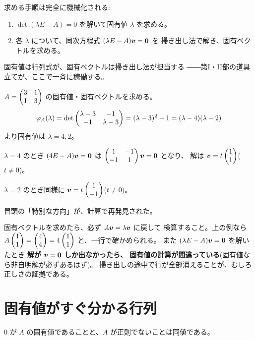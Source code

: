 求める手順は完全に機械化される:
\begin{enumerate}
\item $\det(\lambda E - A) = 0$ を解いて固有値 $\lambda$ を求める。
\item 各 $\lambda$ について、同次方程式 $(\lambda E - A)\bm{v} = \bm{0}$ を
掃き出し法で解き、固有ベクトルを求める。
\end{enumerate}
固有値は行列式が、固有ベクトルは掃き出し法が担当する
――第I・II部の道具立てが、ここで一斉に稼働する。

\begin{rei}
$A = \begin{pmatrix}3 & 1 \\ 1 & 3\end{pmatrix}$ の固有値・固有ベクトルを求める。
\[
\varphi_A(\lambda) = \det \begin{pmatrix}\lambda - 3 & -1 \\ -1 & \lambda - 3\end{pmatrix}
= (\lambda - 3)^2 - 1 = (\lambda - 4)(\lambda - 2)
\]
より固有値は $\lambda = 4, 2$。

$\lambda = 4$ のとき $(4E - A)\bm{v} = \bm{0}$ は
$\begin{pmatrix}1 & -1 \\ -1 & 1\end{pmatrix}\bm{v} = \bm{0}$ となり、
解は $\bm{v} = t\begin{pmatrix}1 \\ 1\end{pmatrix}$($t \neq 0$)。

$\lambda = 2$ のとき同様に $\bm{v} = t\begin{pmatrix}1 \\ -1\end{pmatrix}$($t \neq 0$)。

冒頭の「特別な方向」が、計算で再発見された。
\end{rei}

\begin{chui}[検算のすすめ]
固有ベクトルを求めたら、必ず $A\bm{v} = \lambda\bm{v}$ に戻して
検算すること。上の例なら
$A\begin{pmatrix}1 \\ 1\end{pmatrix} = \begin{pmatrix}4 \\ 4\end{pmatrix} = 4\begin{pmatrix}1 \\ 1\end{pmatrix}$ と、一行で確かめられる。
また $(\lambda E - A)\bm{v} = \bm{0}$ を解いたとき
\textbf{解が $\bm{v} = \bm{0}$ しか出なかったら、
固有値の計算が間違っている}(固有値なら非自明解が必ずあるはず)。
掃き出しの途中で行が全部消えることが、むしろ正しさの証拠である。
\end{chui}

\section{固有値がすぐ分かる行列}

\begin{teiri}\label{thm:eigen-zero}
$0$ が $A$ の固有値であることと、$A$ が正則でないことは同値である。
\end{teiri}

